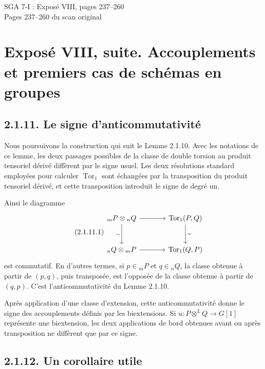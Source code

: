 \documentclass[11pt]{article}
\providecommand{\Tor}{\operatorname{Tor}}
\begin{document}
\begin{center}
{\Large SGA 7-I : Exposé VIII, pages 237--260}\\[0.35em]
{\large Pages 237--260 du scan original}
\end{center}


\section*{Exposé VIII, suite. Accouplements et premiers cas de schémas en groupes}

\subsection*{2.1.11. Le signe d'anticommutativité}

Nous poursuivons la construction qui suit le Lemme 2.1.10.  Avec les notations de ce lemme, les deux passages possibles de la classe de double torsion au produit tensoriel dérivé diffèrent par le signe usuel.  Les deux résolutions standard employées pour calculer \(\Tor_1\) sont échangées par la transposition du produit tensoriel dérivé, et cette transposition introduit le signe de degré un.

Ainsi le diagramme
\begin{equation}\tag{2.1.11.1}
\begin{tikzcd}[column sep=large,row sep=large]
 {}_mP\otimes {}_nQ \arrow[r] \arrow[d,"-"'] & \Tor_1(P,Q)\arrow[d,"\sim"]\\
 {}_nQ\otimes {}_mP \arrow[r] & \Tor_1(Q,P)
\end{tikzcd}
\end{equation}
est commutatif.  En d'autres termes, si \(p\in{}_mP\) et \(q\in{}_nQ\), la classe obtenue à partir de \((p,q)\), puis transposée, est l'opposée de la classe obtenue à partir de \((q,p)\).  C'est l'anticommutativité du Lemme 2.1.10.

Après application d'une classe d'extension, cette anticommutativité donne le signe des accouplements définis par les biextensions.  Si \(u:P\otimes^LQ\to G[1]\) représente une biextension, les deux applications de bord obtenues avant ou après transposition ne diffèrent que par ce signe.

\subsection*{2.1.12. Un corollaire utile}
\end{document}
